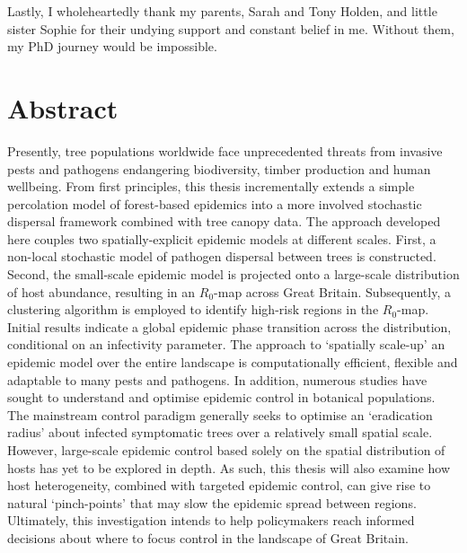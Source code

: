 Lastly, I wholeheartedly thank my parents, Sarah and Tony Holden, and little sister Sophie for their undying support and constant belief in me. Without them, my PhD journey would be impossible.


\chapter*{Abstract}

Presently, tree populations worldwide face unprecedented threats from invasive pests and pathogens endangering biodiversity, timber production and human wellbeing. 
From first principles, this thesis incrementally extends a simple percolation model of forest-based epidemics into a more involved stochastic dispersal framework combined with tree canopy data. 
The approach developed here couples two spatially-explicit epidemic models at different scales. 
First, a non-local stochastic model of pathogen dispersal between trees is constructed. 
Second, the small-scale epidemic model is projected onto a large-scale distribution of host abundance, resulting in an $R_0$-map across Great Britain. 
Subsequently, a clustering algorithm is employed to identify high-risk regions in the $R_0$-map. 
Initial results indicate a global epidemic phase transition across the distribution, conditional on an infectivity parameter.
The approach to `spatially scale-up' an epidemic model over the entire landscape is computationally efficient, flexible and adaptable to many pests and pathogens. 
In addition, numerous studies have sought to understand and optimise epidemic control in botanical populations. 
The mainstream control paradigm generally seeks to optimise an `eradication radius' about infected symptomatic trees over a relatively small spatial scale. However, large-scale epidemic control based solely on the spatial distribution of hosts has yet to be explored in depth. 
As such, this thesis will also examine how host heterogeneity, combined with targeted epidemic control, can give rise to natural `pinch-points' that may slow the epidemic spread between regions. 
Ultimately, this investigation intends to help policymakers reach informed decisions about where to focus control in the landscape of Great Britain.

\newcommand{\RNum}[1]{\uppercase\expandafter{\romannumeral #1\relax}}
